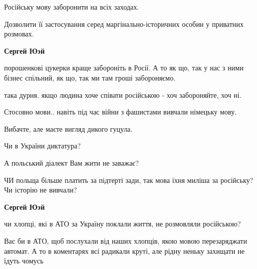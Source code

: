 \begin{itemize}
\begin{itemize}
 

Російську мову заборонити на всіх заходах.

Дозволити її застосування серед маргінально-історичних особин у приватних
розмовах.

\begin{itemize}
 
\textbf{Сергей Юэй} 

порошенкові цукерки краще забороніть в Росії. А то як що, так у нас з ними
бізнес спільний, як що, так ми там гроші забороняємо.

така дурня. якщо людина хоче співати російською - хоч забороняйте, хоч ні.

Стосовно мови.. навіть під час війни з фашистами вивчали німецьку мову.

Вибачте, але маєте вигляд дикого гуцула.

Чи в України диктатура?

А польський діалект Вам жити не заважає?

ЧИ польща більше платить за підтерті зади, так мова їхня миліша за російську?
Чи історію не вивчали?

 
\textbf{Сергей Юэй} 

чи хлопці, які в АТО за Україну поклали життя, не розмовляли російською?

Вас би в АТО, щоб послухали від наших хлопців, якою мовою перезаряджати
автомат. А то в коментарях всі радикали круті, але рідну неньку захищати не
їдуть чомусь


 

\end{itemize}
\end{itemize}
\end{itemize}
